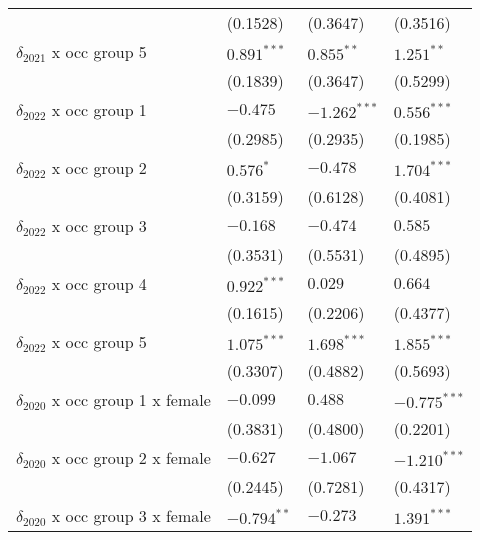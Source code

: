 \begin{tabular}{llll}
                                       &           (0.1528) &           (0.3647) &           (0.3516) \\
$\delta_{2021}$ x occ group 5          &      $0.891^{***}$ &       $0.855^{**}$ &       $1.251^{**}$ \\
                                       &           (0.1839) &           (0.3647) &           (0.5299) \\
$\delta_{2022}$ x occ group 1          &           $-0.475$ &     $-1.262^{***}$ &      $0.556^{***}$ \\
                                       &           (0.2985) &           (0.2935) &           (0.1985) \\
$\delta_{2022}$ x occ group 2          &          $0.576^*$ &           $-0.478$ &      $1.704^{***}$ \\
                                       &           (0.3159) &           (0.6128) &           (0.4081) \\
$\delta_{2022}$ x occ group 3          &           $-0.168$ &           $-0.474$ &            $0.585$ \\
                                       &           (0.3531) &           (0.5531) &           (0.4895) \\
$\delta_{2022}$ x occ group 4          &      $0.922^{***}$ &            $0.029$ &            $0.664$ \\
                                       &           (0.1615) &           (0.2206) &           (0.4377) \\
$\delta_{2022}$ x occ group 5          &      $1.075^{***}$ &      $1.698^{***}$ &      $1.855^{***}$ \\
                                       &           (0.3307) &           (0.4882) &           (0.5693) \\
$\delta_{2020}$ x occ group 1 x female &           $-0.099$ &            $0.488$ &     $-0.775^{***}$ \\
                                       &           (0.3831) &           (0.4800) &           (0.2201) \\
$\delta_{2020}$ x occ group 2 x female &           $-0.627$ &           $-1.067$ &     $-1.210^{***}$ \\
                                       &           (0.2445) &           (0.7281) &           (0.4317) \\
$\delta_{2020}$ x occ group 3 x female &      $-0.794^{**}$ &           $-0.273$ &      $1.391^{***}$ \\

\end{tabular}

